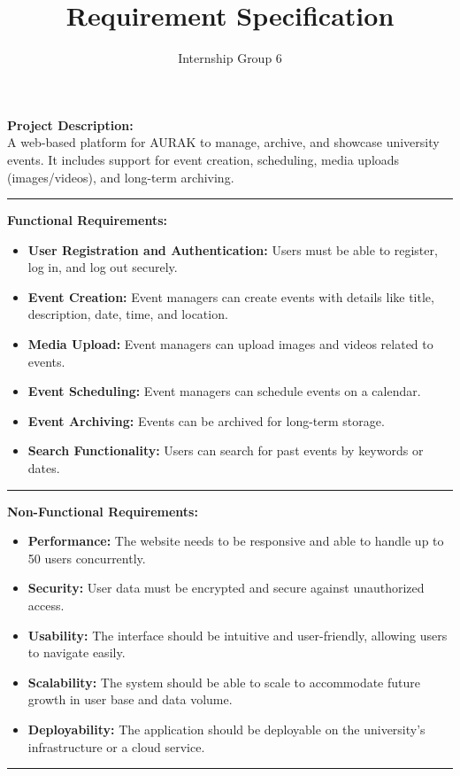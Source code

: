 \documentclass{article}
\title{Requirement Specification}
\author{Internship Group 6}
\begin{document}
\maketitle
\noindent
\textbf{Project Description:}\\
A web-based platform for AURAK to manage, archive, and showcase university events. It includes support for event creation, scheduling, media uploads (images/videos), and long-term archiving.
\par\noindent\rule{\textwidth}{0.5pt}
\textbf{Functional Requirements:}
\begin{itemize}
    \item \textbf{User Registration and Authentication:} Users must be able to register, log in, and log out securely.
    \item \textbf{Event Creation:} Event managers can create events with details like title, description, date, time, and location.
    \item \textbf{Media Upload:} Event managers can upload images and videos related to events.
    \item \textbf{Event Scheduling:} Event managers can schedule events on a calendar.
    \item \textbf{Event Archiving:} Events can be archived for long-term storage.
    \item \textbf{Search Functionality:} Users can search for past events by keywords or dates.
\end{itemize}
\par\noindent\rule{\textwidth}{0.5pt}
\textbf{Non-Functional Requirements:}
\begin{itemize}
    \item \textbf{Performance:} The website needs to be responsive and able to handle up to 50 users concurrently.
    \item \textbf{Security:} User data must be encrypted and secure against unauthorized access.
    \item \textbf{Usability:} The interface should be intuitive and user-friendly, allowing users to navigate easily.
    \item \textbf{Scalability:} The system should be able to scale to accommodate future growth in user base and data volume.
    \item \textbf{Deployability:} The application should be deployable on the university's infrastructure or a cloud service.
    \end{itemize}
\par\noindent\rule{\textwidth}{0.5pt}
\end{document}

